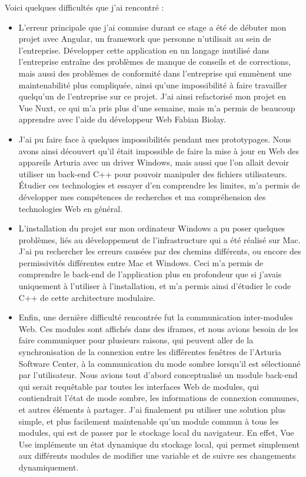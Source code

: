 \documentclass[francais]{rapportPFE}  %
\begin{document}
Voici quelques difficultés que j'ai rencontré : 
\begin{itemize}
    \item L'erreur principale que j'ai commise durant ce stage a été de débuter mon projet avec Angular, un framework que personne n'utilisait au sein de l'entreprise. Développer cette application en un langage inutilisé dans l'entreprise entraîne des problèmes de manque de conseils et de corrections, mais aussi des problèmes de conformité dans l'entreprise qui emmènent une maintenabilité plus compliquée, ainsi qu'une impossibilité à faire travailler quelqu'un de l'entreprise sur ce projet. J'ai ainsi refactorisé mon projet en Vue Nuxt, ce qui m'a pris plus d'une semaine, mais m'a permis de beaucoup apprendre avec l'aide du développeur Web Fabian Biolay.
    \item J'ai pu faire face à quelques impossibilités pendant mes prototypages. Nous avons ainsi découvert qu'il était impossible de faire la mise à jour en Web des appareils Arturia avec un driver Windows, mais aussi que l'on allait devoir utiliser un back-end C++ pour pouvoir manipuler des fichiers utilisateurs. Étudier ces technologies et essayer d'en comprendre les limites, m'a permis de développer mes compétences de recherches et ma compréhension des technologies Web en général.
    \item L'installation du projet sur mon ordinateur Windows a pu poser quelques problèmes, liés au développement de l'infrastructure qui a été réalisé sur Mac. J'ai pu rechercher les erreurs causées par des chemins différents, ou encore des permissivités différentes entre Mac et Windows. Ceci m'a permis de comprendre le back-end de l'application plus en profondeur que si j'avais uniquement à l'utiliser à l'installation, et m'a permis ainsi d'étudier le code C++ de cette architecture modulaire.
    \item Enfin, une dernière difficulté rencontrée fut la communication inter-modules Web. Ces modules sont affichés dans des iframes, et nous avions besoin de les faire communiquer pour plusieurs raisons, qui peuvent aller de la synchronisation de la connexion entre les différentes fenêtres de l'Arturia Software Center, à la communication du mode sombre lorsqu'il est sélectionné par l'utilisateur. Nous avions tout d'abord conceptualisé un module back-end qui serait requêtable par toutes les interfaces Web de modules, qui contiendrait l'état de mode sombre, les informations de connexion communes, et autres éléments à partager. J'ai finalement pu utiliser une solution plus simple, et plus facilement maintenable qu'un module commun à tous les modules, qui est de passer par le stockage local du navigateur. En effet, Vue Use implémente un état dynamique du stockage local, qui permet simplement aux différents modules de modifier une variable et de suivre ses changements dynamiquement.
\end{itemize}
% 
\end{document}

